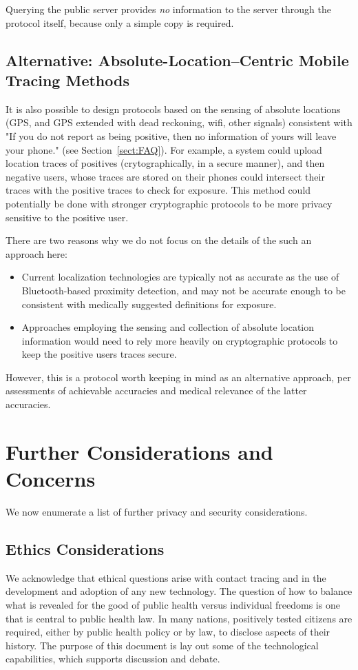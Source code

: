 \documentclass{article}
\begin{document}
Querying the public server provides \emph{no} information to the server through the protocol itself, because only a simple copy is required.  

\subsection{Alternative: Absolute-Location--Centric Mobile Tracing Methods}\label{sect:GPS}
It is also possible to design protocols based on the sensing of absolute locations (GPS, and GPS extended with dead reckoning, wifi, other signals) consistent with "If you do not report as being positive, then no information of yours will leave your phone." (see Section~\ref{sect:FAQ}).  For example, a system could upload location traces of positives (crytographically, in a secure manner), and then negative users, whose traces are stored on their phones could intersect their traces with the positive traces to check for exposure. This method could potentially be done with stronger cryptographic protocols to be more privacy sensitive to the positive user.

There are two reasons why we do not focus on the details of the such an approach here:
\begin{itemize}
    \item Current localization technologies are typically not as accurate as the use of Bluetooth-based proximity detection, and may not be accurate enough to be consistent with medically suggested definitions for exposure.
    \item Approaches employing the sensing and collection of absolute location information would need to rely more heavily on cryptographic protocols to keep the positive users traces secure.
\end{itemize}
However, this is a protocol worth keeping in mind as an alternative approach, per assessments of achievable accuracies and medical relevance of the latter accuracies.

\section{Further Considerations and Concerns}
We now enumerate a list of further privacy and security considerations.

\subsection{Ethics Considerations}
We acknowledge that ethical questions arise with contact tracing and in the development and adoption of any new technology. The question of how to balance what is revealed for the good of public health versus individual freedoms is one that is central to public health law. In many nations, positively tested citizens are required, either by public health policy or by law, 
to disclose aspects of their history.  The purpose of this document is lay out some of the technological capabilities, which supports discussion and debate.
\end{document}
